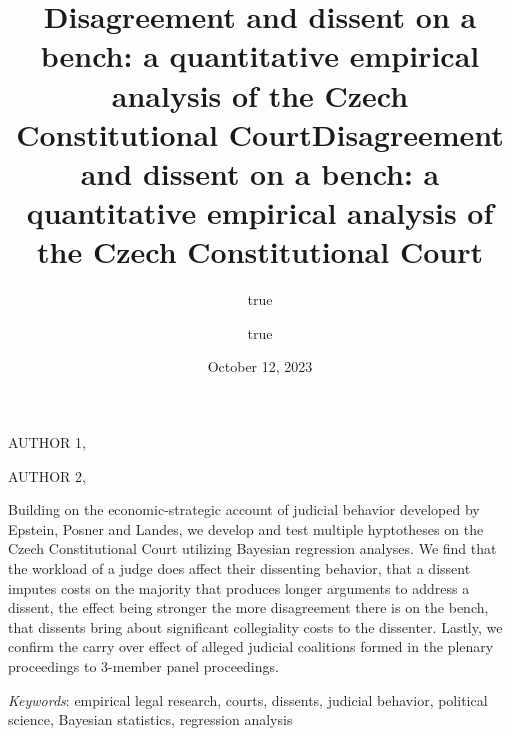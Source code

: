 \documentclass[
  11pt,
]{article}
\title{Disagreement and dissent on a bench: a quantitative empirical
analysis of the Czech Constitutional Court}
\author{true \and true}
\date{October 12, 2023}
\title{Disagreement and dissent on a bench: a quantitative empirical
analysis of the Czech Constitutional Court }
\date{}
\renewenvironment{abstract}
 {{%
    \setlength{\leftmargin}{0mm}
    \setlength{\rightmargin}{\leftmargin}%
  }%
  \relax}
 {\endlist}
\begin{document}



{%
\setlength{\parindent}{0pt}
\thispagestyle{plain}
{%
\maketitle  %

}




{
   \vskip 13.5pt\relax \normalsize\fontsize{11}{12}
   \MakeUppercase{Author
1}, \small{}   \par \vskip -3.5pt \MakeUppercase{Author 2}, \small{}   

}

}








\begin{abstract}


    \vskip 8.5pt %

\noindent \small{Building on the economic-strategic account of judicial
behavior developed by Epstein, Posner and Landes, we develop and test
multiple hyptotheses on the Czech Constitutional Court utilizing
Bayesian regression analyses. We find that the workload of a judge does
affect their dissenting behavior, that a dissent imputes costs on the
majority that produces longer arguments to address a dissent, the effect
being stronger the more disagreement there is on the bench, that
dissents bring about significant collegiality costs to the dissenter.
Lastly, we confirm the carry over effect of alleged judicial coalitions
formed in the plenary proceedings to 3-member panel proceedings.}


\vskip 8.5pt \noindent \emph{Keywords}: empirical legal research,
courts, dissents, judicial behavior, political science, Bayesian
statistics, regression analysis \par




\end{abstract}
\end{document}
